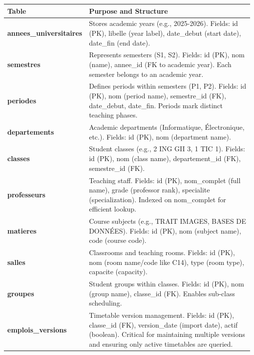 \begin{center}
\begin{tabular}{|p{2.5cm}|p{10cm}|}
\hline
\textbf{Table} & \textbf{Purpose and Structure} \\
\hline

\textbf{annees\_universitaires} & 
Stores academic years (e.g., 2025-2026). Fields: id (PK), libelle (year label), date\_debut (start date), date\_fin (end date). \\
\hline

\textbf{semestres} & 
Represents semesters (S1, S2). Fields: id (PK), nom (name), annee\_id (FK to academic year). Each semester belongs to an academic year. \\
\hline

\textbf{periodes} & 
Defines periods within semesters (P1, P2). Fields: id (PK), nom (period name), semestre\_id (FK), date\_debut, date\_fin. Periods mark distinct teaching phases. \\
\hline

\textbf{departements} & 
Academic departments (Informatique, Électronique, etc.). Fields: id (PK), nom (department name). \\
\hline

\textbf{classes} & 
Student classes (e.g., 2 ING GII 3, 1 TIC 1). Fields: id (PK), nom (class name), departement\_id (FK), semestre\_id (FK). \\
\hline

\textbf{professeurs} & 
Teaching staff. Fields: id (PK), nom\_complet (full name), grade (professor rank), specialite (specialization). Indexed on nom\_complet for efficient lookup. \\
\hline

\textbf{matieres} & 
Course subjects (e.g., TRAIT IMAGES, BASES DE DONNÉES). Fields: id (PK), nom (subject name), code (course code). \\
\hline

\textbf{salles} & 
Classrooms and teaching rooms. Fields: id (PK), nom (room name/code like C14), type (room type), capacite (capacity). \\
\hline

\textbf{groupes} & 
Student groups within classes. Fields: id (PK), nom (group name), classe\_id (FK). Enables sub-class scheduling. \\
\hline

\textbf{emplois\_versions} & 
Timetable version management. Fields: id (PK), classe\_id (FK), version\_date (import date), actif (boolean). Critical for maintaining multiple versions and ensuring only active timetables are queried. \\
\hline


\end{tabular}
\end{center}
